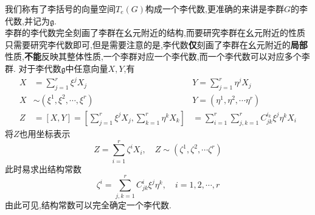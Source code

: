 我们称有了李括号的向量空间$T_e(G)$构成一个李代数,更准确的来讲是李群$G$的李代数,并记为$\mathfrak{g}$.\\
李群的李代数完全刻画了李群在幺元附近的结构,而要研究李群在幺元附近的性质只需要研究李代数即可,但是需要注意的是,李代数\textbf{仅}刻画了李群在幺元附近的\textbf{局部}性质,\textbf{不能}反映其整体性质,一个李群对应一个李代数,而一个李代数可以对应多个李群.
对于李代数$\mathfrak{g}$中任意向量$X,Y$,有
\begin{equation}
    \begin{aligned}
        X&=\sum_{j=1}^{r}\xi^{j}X_{j}&Y=\sum_{j=1}^{r}\eta^{j}X_{j}\\
        X&\sim(\xi^{1},\xi^{2},\cdots,\xi^{r})&Y=(\eta^{1},\eta^{2},\cdots\eta^{r})\\
        Z&=[X,Y]=\left[\sum_{j=1}^{r}\xi^{j}X_{j},\sum_{k=1}^{r}\eta^{k}X_{k}\right]&=\sum_{i=1}^{r}\sum_{j,k=1}^{r}C_{jk}^{i_{k}}\xi^{j}\eta^{k}X_{i}
    \end{aligned}
\end{equation}
将$Z$也用坐标表示
\begin{equation}
    Z=\sum_{i=1}^{r}\zeta^{ i}X_{i},\quad Z\sim(\zeta^{ 1},\zeta^{ 2},\cdots\zeta^{ r})
\end{equation}
此时易求出结构常数
\begin{equation}
    \zeta^{i}=\sum_{j,k=1}^{r}C_{jk}^{i}\xi^{j}\eta^{k},\quad i=1,2,\cdots,r
\end{equation}
由此可见,结构常数可以完全确定一个李代数.

